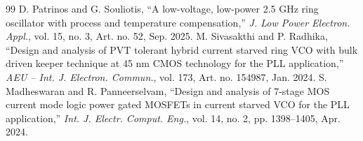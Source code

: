 \documentclass[11pt,a4paper]{article}
\begin{document}
\begin{thebibliography}{99}
 D. Patrinos and G. Souliotis, ``A low-voltage, low-power 2.5 GHz ring oscillator with process and temperature compensation,'' \emph{J. Low Power Electron. Appl.}, vol. 15, no. 3, Art. no. 52, Sep. 2025.
 M. Sivasakthi and P. Radhika, ``Design and analysis of PVT tolerant hybrid current starved ring VCO with bulk driven keeper technique at 45 nm CMOS technology for the PLL application,'' \emph{AEU -- Int. J. Electron. Commun.}, vol. 173, Art. no. 154987, Jan. 2024.
 S. Madheswaran and R. Panneerselvam, ``Design and analysis of 7-stage MOS current mode logic power gated MOSFETs in current starved VCO for the PLL application,'' \emph{Int. J. Electr. Comput. Eng.}, vol. 14, no. 2, pp. 1398--1405, Apr. 2024.
\end{thebibliography}

\appendix
\end{document}
